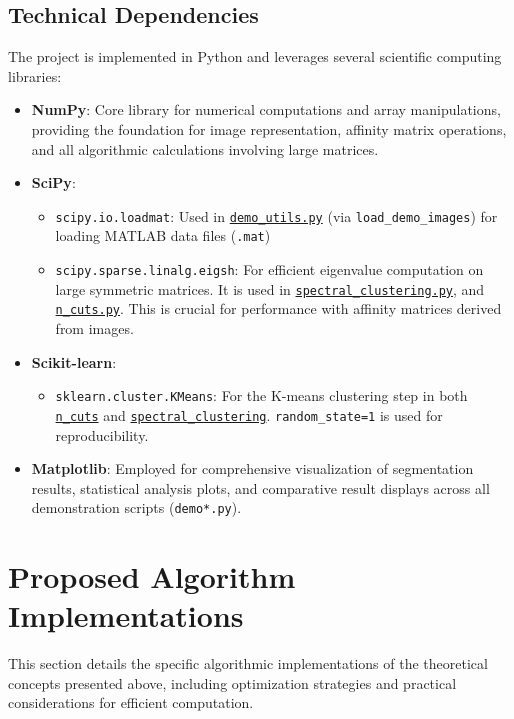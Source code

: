 \documentclass[12pt,a4paper]{article}
\begin{document}
\subsection{Technical Dependencies}
The project is implemented in Python and leverages several scientific computing libraries:
\begin{itemize}
    \item \textbf{NumPy}: Core library for numerical computations and array manipulations, providing the foundation for image representation, affinity matrix operations, and all algorithmic calculations involving large matrices.
    \item \textbf{SciPy}:
        \begin{itemize}
            \item \texttt{scipy.io.loadmat}: Used in \href{Code/demo_utils.py}{\texttt{demo\_utils.py}} (via \texttt{load\_demo\_images}) for loading MATLAB data files (\texttt{.mat})
            \item \texttt{scipy.sparse.linalg.eigsh}: For efficient eigenvalue computation on large symmetric matrices. It is used in \href{Code/spectral_clustering.py}{\texttt{spectral\_clustering.py}}, and \href{Code/n_cuts.py}{\texttt{n\_cuts.py}}. This is crucial for performance with affinity matrices derived from images.
        \end{itemize}
    \item \textbf{Scikit-learn}:
        \begin{itemize}
            \item \texttt{sklearn.cluster.KMeans}: For the K-means clustering step in both \href{Code/n_cuts.py}{\texttt{n\_cuts}} and \href{Code/spectral_clustering.py}{\texttt{spectral\_clustering}}. \texttt{random\_state=1} is used for reproducibility.
        \end{itemize}
    \item \textbf{Matplotlib}: Employed for comprehensive visualization of segmentation results, statistical analysis plots, and comparative result displays across all demonstration scripts (\texttt{demo*.py}).
\end{itemize}


\section{Proposed Algorithm Implementations}

This section details the specific algorithmic implementations of the theoretical concepts presented above, including optimization strategies and practical considerations for efficient computation.
\end{document}
